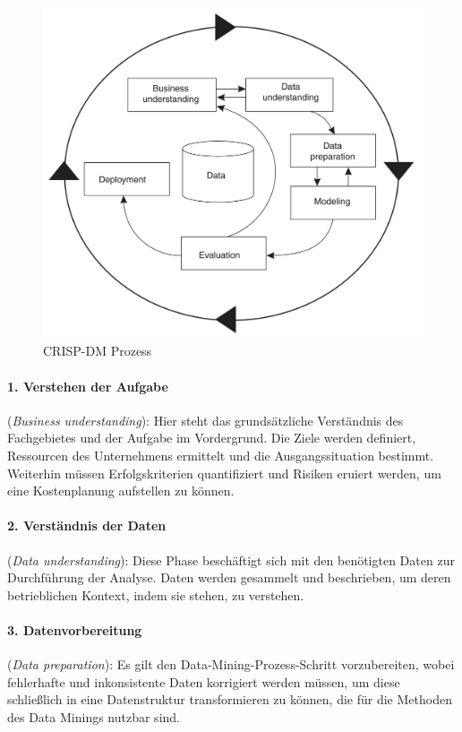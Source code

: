 \begin{figure}[H]
\centering
\includegraphics[scale=0.9]{se-wa-jpg/crisp}
\caption[CRISP-DM Prozess]{CRISP-DM Prozess\protect\footnotemark}
\label{crisp}
\end{figure}

\paragraph{1. Verstehen der Aufgabe}(\textit{Business understanding}): 
Hier steht das grundsätzliche Verständnis des Fachgebietes und der Aufgabe im Vordergrund. Die Ziele werden definiert, Ressourcen des Unternehmens ermittelt und die Ausgangssituation bestimmt. Weiterhin müssen Erfolgskriterien quantifiziert und Risiken eruiert werden, um eine Kostenplanung aufstellen zu können. 
\paragraph{2. Verständnis der Daten}(\textit{Data understanding}): 
Diese Phase beschäftigt sich mit den benötigten Daten zur Durchführung der Analyse. Daten werden gesammelt und beschrieben, um deren betrieblichen Kontext, indem sie stehen, zu verstehen.
\paragraph{3. Datenvorbereitung}(\textit{Data preparation}): 
Es gilt den Data-Mining-Prozess-Schritt vorzubereiten, wobei fehlerhafte und inkonsistente Daten korrigiert werden müssen, um diese schließlich in eine Datenstruktur transformieren zu können, die für die Methoden des Data Minings nutzbar sind.
